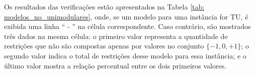 
Os resultados das verificações estão apresentados na Tabela \ref{tab: modelos_no_unimodulares}, onde, se um modelo para uma instância for TU, é exibida uma linha `` - '' na célula correspondente. Caso contrário, são mostrados três dados na mesma célula: o primeiro valor representa a quantidade de restrições que não são compostas apenas por valores no conjunto $\{-1,0,+1\}$; o segundo valor indica o total de restrições desse modelo para essa instância; e o último valor mostra a relação percentual entre os dois primeiros valores.

